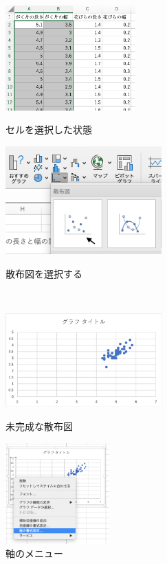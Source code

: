 \begin{figure}[tb]
    \begin{minipage}{0.5\hsize}
        \centering
        \includegraphics[width=5cm]{chap2/scatter_data.png}
        \caption{セルを選択した状態}
        \label{fig:scatter_data}
    \end{minipage}
 \begin{minipage}{0.5\hsize}
        \centering
        \includegraphics[width=6cm]{chap2/scatter_menu.png}
        \caption{散布図を選択する}
        \label{fig:select_barchart_hist}
    \end{minipage}
    \\
    \begin{minipage}{0.5\hsize}
        \centering
        \includegraphics[width=6cm]{chap2/scatter1.png}
        \caption{未完成な散布図}
        \label{fig:scatter1}
    \end{minipage}
    \begin{minipage}{0.5\hsize}
        \centering
        \includegraphics[width=4cm]{chap2/scatter_axis.png}
        \caption{軸のメニュー}
        \label{fig:scatter_axis}
    \end{minipage}
\end{figure}

